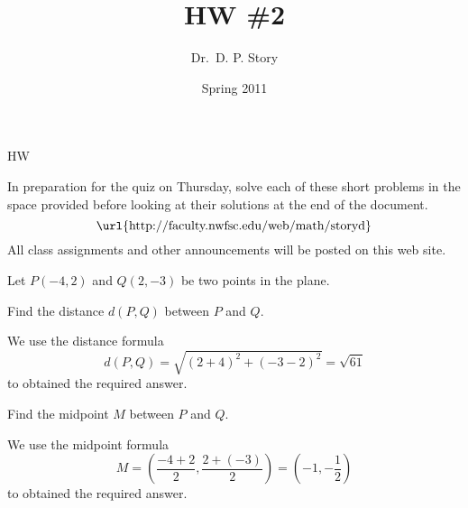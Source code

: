 \documentclass{article}
\title[HW2]{HW \#2}
\author{Dr.\ D. P. Story}
\date{Spring 2011}
\begin{document}
\maketitle

\begin{exam}{HW}

\begin{instructions}[]
In preparation for the quiz on Thursday, solve each of these short
problems in the space provided before looking at their solutions at the
end of the document.
\[
   \text{\url{http://faculty.nwfsc.edu/web/math/storyd}}
\]
All class assignments and other announcements will be posted on
this web site.
\end{instructions}

\begin{problem*}[4ea]
Let $P(-4,2)$ and $Q(2,-3)$ be two points in the plane.
\begin{parts}
\item Find the distance $d(P,Q)$ between $P$ and $Q$.
\begin{solution}[1in]
We use the distance formula
\[
    d(P,Q)=\sqrt{(2+4)^2+(-3-2)^2}=\sqrt{61}
\]
to obtained the required answer.
\end{solution}

\item Find the midpoint $M$ between $P$ and $Q$.
\begin{solution}[\sameVspace]
We use the midpoint formula
\[
    M=\left(\frac{-4+2}{2},\frac{2+(-3)}{2}\right)=\left(-1,-\dfrac{1}{2}\right)
\]
to obtained the required answer.
\end{solution}
\end{parts}
\end{problem*}


\end{exam}
\end{document}
